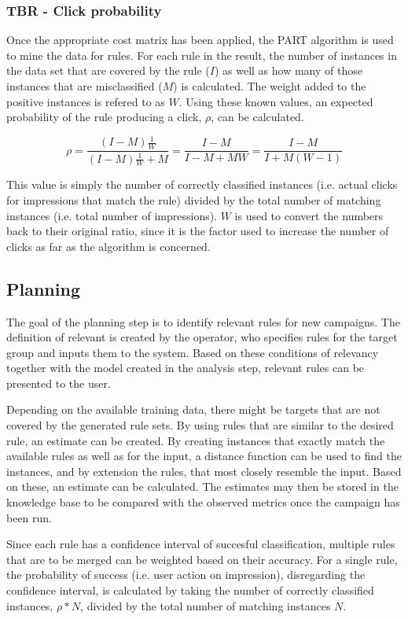 \documentclass[a4paper]{article}
\begin{document}
\subsubsection{TBR - Click probability}
Once the appropriate cost matrix has been applied, the PART algorithm \citep{Frank1998} is used to mine the data for rules.
For each rule in the result, the number of instances in the data set that are covered by the rule (\(I\)) as well as how many of
those instances that are misclassified (\(M\)) is calculated. The weight added to the positive instances is refered to as \(W\).
Using these known values, an expected probability of the rule producing a click, \(\rho\), can be calculated.

\[
	\rho = \frac{(I-M)\frac{1}{W}}{(I-M)\frac{1}{W}+M} = \frac{I-M}{I-M+MW} = \frac{I-M}{I+M(W-1)}
\]

This value is simply the number of correctly classified instances (i.e. actual clicks for impressions that match the rule) divided
by the total number of matching instances (i.e. total number of impressions). \(W\) is used to convert the numbers back to their
original ratio, since it is the factor used to increase the number of clicks as far as the algorithm is concerned.

\subsection{Planning}
The goal of the planning step is to identify relevant rules for new campaigns. The definition of relevant is created by the
operator, who specifies rules for the target group and inputs them to the system. Based on these conditions of relevancy together
with the model created in the analysis step, relevant rules can be presented to the user.

Depending on the available training data, there might be targets that are not covered by the generated rule sets. By using rules
that are similar to the desired rule, an estimate can be created. By creating instances that exactly match the available rules as
well as for the input, a distance function can be used to find the instances, and by extension the rules, that most closely 
resemble the input. Based on these, an estimate can be calculated. The estimates may then be stored in the knowledge base to be
compared with the observed metrics once the campaign has been run.

Since each rule has a confidence interval of succesful classification, multiple rules that are to be merged can be weighted based
on their accuracy. For a single rule, the probability of success (i.e. user action on impression), disregarding the confidence
interval, is calculated by taking the number of correctly classified instances, \(\rho*N\), divided by the total number of matching instances \(N\).
\end{document}

